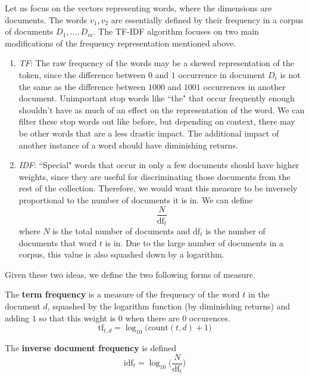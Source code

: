 \documentclass{article}
\begin{document}
    Let us focus on the vectors representing words, where the dimensions are documents. The words $v_1, v_2$ are essentially defined by their frequency in a corpus of documents $D_1, \ldots, D_m$. The TF-IDF algorithm focuses on two main modifications of the frequency representation mentioned above. 
    \begin{enumerate}
      \item \textit{TF}: The raw frequency of the words may be a skewed representation of the token, since the difference between $0$ and $1$ occurrence in document $D_i$ is not the same as the difference between $1000$ and $1001$ occurrences in another document. Unimportant stop words like ``the" that occur frequently enough shouldn't have as much of an effect on the representation of the word. We can filter these stop words out like before, but depending on context, there may be other words that are a less drastic impact. The additional impact of another instance of a word should have diminishing returns. 
      \item \textit{IDF}: ``Special" words that occur in only a few documents should have higher weights, since they are useful for discriminating those documents from the rest of the collection. Therefore, we would want this measure to be inversely proportional to the number of documents it is in. We can define 
      \begin{equation}
        \frac{N}{\mathrm{df}_t}
      \end{equation}
      where $N$ is the total number of documents and $\mathrm{df}_t$ is the number of documents that word $t$ is in. Due to the large number of documents in a corpus, this value is also squashed down by a logarithm. 
    \end{enumerate}
    Given these two ideas, we define the two following forms of measure. 

    \begin{definition}[TF]
      \label{def:tf}
      The \textbf{term frequency} is a measure of the frequency of the word $t$ in the document $d$, squashed by the logarithm function (by diminishing returns) and adding $1$ so that this weight is $0$ when there are $0$ occurences. 
      \begin{equation}
        \mathrm{tf}_{t, d} = \log_{10} \big( \mathrm{count}(t, d) + 1 \big)
      \end{equation}
    \end{definition}

    \begin{definition}[IDF]
      \label{def:idf}
      The \textbf{inverse document frequency} is defined 
      \begin{equation}
        \mathrm{idf}_t = \log_{10} \bigg( \frac{N}{\mathrm{df}_t} \bigg)
      \end{equation}
    \end{definition}
\end{document}

